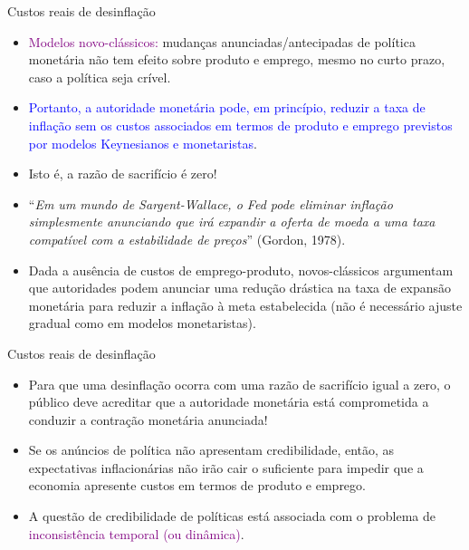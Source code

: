 \documentclass[10pt]{beamer}
\begin{document}
\begin{frame}{Custos reais de desinflação}
    \begin{itemize}
        \item \textcolor{purple}{Modelos novo-clássicos:} mudanças anunciadas/antecipadas de política monetária não tem efeito sobre produto e emprego, mesmo no curto prazo, caso a política seja crível.
        \bigskip
        \item \textcolor{blue}{Portanto, a autoridade monetária pode, em princípio, reduzir a taxa de inflação sem os custos associados em termos de produto e emprego previstos por modelos Keynesianos e monetaristas}.
        \bigskip
        \item Isto é, a razão de sacrifício é zero!
        \bigskip
        \item ``\emph{Em um mundo de Sargent-Wallace, o Fed pode eliminar inflação simplesmente anunciando que irá expandir a oferta de moeda a uma taxa compatível com a estabilidade de preços}'' (Gordon, 1978).
        \bigskip
        \item Dada a ausência de custos de emprego-produto, novos-clássicos argumentam que autoridades podem anunciar uma redução drástica na taxa de expansão monetária para reduzir a inflação à meta estabelecida (não é necessário ajuste gradual como em modelos monetaristas).
    \end{itemize}
\end{frame}

\begin{frame}{Custos reais de desinflação}
    \begin{itemize}
        \item Para que uma desinflação ocorra com uma razão de sacrifício igual a zero, o público deve acreditar que a autoridade monetária está comprometida a conduzir a contração monetária anunciada!
        \bigskip
        \item Se os anúncios de política não apresentam credibilidade, então, as expectativas inflacionárias não irão cair o suficiente para impedir que a economia apresente custos em termos de produto e emprego.
        \bigskip
        \item A questão de credibilidade de políticas está associada com o problema de \textcolor{purple}{inconsistência temporal (ou dinâmica)}.
    \end{itemize}
\end{frame}
\end{document}
